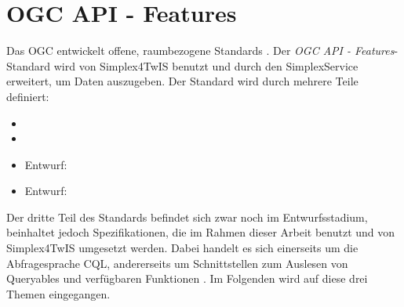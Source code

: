 \section{\acs{OGC} \acs{API} - Features}
\label{sec:ogc}

Das \acf{OGC} entwickelt offene, raumbezogene Standards  . Der \textit{OGC API - Features}-Standard wird von Simplex4TwIS benutzt und durch den SimplexService erweitert, um Daten auszugeben. Der Standard wird durch mehrere Teile definiert:
\begin{itemize}
  \item {} 
  \item {} 
  \item Entwurf:  
  \item Entwurf:  
\end{itemize}

Der dritte Teil des Standards befindet sich zwar noch im Entwurfsstadium, beinhaltet jedoch Spezifikationen, die im Rahmen dieser Arbeit benutzt und von Simplex4TwIS umgesetzt werden. Dabei handelt es sich einerseits um die Abfragesprache \acf{CQL}, andererseits um Schnittstellen zum Auslesen von Queryables und verfügbaren Funktionen . Im Folgenden wird auf diese drei Themen eingegangen.
